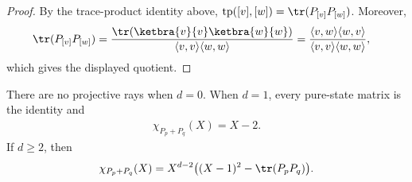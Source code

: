 \begin{proof}\leanok
    By the trace-product identity above,
    $\operatorname{tp}([v],[w])=\tr(P_{[v]}P_{[w]})$. Moreover,
    \begin{align}
        \tr(P_{[v]}P_{[w]})
        &=\frac{\tr(\ketbra{v}{v}\ketbra{w}{w})}
          {\langle v,v\rangle\langle w,w\rangle}
        =\frac{\langle v,w\rangle\langle w,v\rangle}
          {\langle v,v\rangle\langle w,w\rangle},
    \end{align}
    which gives the displayed quotient.
\end{proof}

\begin{theorem}
    \label{thm:charpoly_sum_two_pure_states}
    \leanok
    There are no projective rays when $d=0$. When $d=1$, every pure-state
    matrix is the identity and
    \begin{align}
        \chi_{P_p+P_q}(X)=X-2.
    \end{align}
    If $d\geq2$, then
    \begin{align}
        \chi_{P_p+P_q}(X)
        =X^{d-2}\bigl((X-1)^2-\tr(P_pP_q)\bigr).
        \label{eq:charpoly_sum_two_pure_states}
    \end{align}
\end{theorem}

